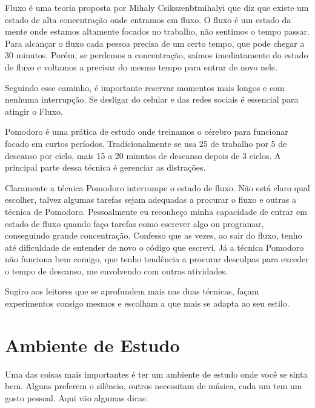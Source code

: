 Fluxo é uma teoria proposta por Mihaly Csikszenbtmihalyi que diz que existe um estado de alta concentração onde entramos em fluxo. O fluxo é um estado da mente onde estamos altamente focados no trabalho, não sentimos o tempo passar. Para alcançar o fluxo cada pessoa precisa de um certo tempo, que pode chegar a 30 minutos. Porém, se perdemos a concentração, saímos imediatamente do estado de fluxo e voltamos a precisar do mesmo tempo para entrar de novo nele. 


Seguindo esse caminho, é importante reservar momentos mais longos e com nenhuma interrupção. Se desligar do celular e das redes sociais é essencial para atingir o Fluxo.


Pomodoro é uma prática de estudo onde treinamos o cérebro para funcionar focado em curtos períodos. Tradicionalmente se usa 25 de trabalho por 5 de descanso por ciclo, mais 15 a 20 minutos de descanso depois de 3 ciclos. A principal parte dessa técnica é gerenciar as distrações.


Claramente a técnica Pomodoro interrompe o estado de fluxo. Não está claro qual escolher, talvez algumas tarefas sejam adequadas a procurar o fluxo e outras a técnica de Pomodoro. Pessoalmente eu reconheço minha capacidade de entrar em estado de fluxo quando faço tarefas como escrever algo ou programar, conseguindo grande concentração. Confesso que as vezes, ao sair do fluxo, tenho até dificuldade de entender de novo o código que escrevi. Já a técnica Pomodoro não funciona bem comigo, que tenho tendência a procurar desculpas para exceder o tempo de descanso, me envolvendo com outras atividades.


Sugiro aos leitores que se aprofundem mais nas duas técnicas, façam experimentos consigo mesmos e escolham a que mais se adapta ao seu estilo.


\section{Ambiente de Estudo}


Uma das coisas mais importantes é ter um ambiente de estudo onde você se sinta bem. Alguns preferem o silêncio, outros necessitam de música, cada um tem um gosto pessoal. Aqui vão algumas dicas: 

